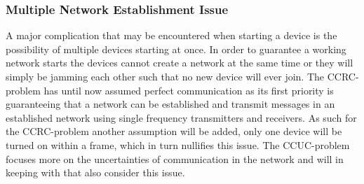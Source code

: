 \subsubsection*{Multiple Network Establishment Issue}\label{msiCCRC}
A major complication that may be encountered when starting a device is the possibility of multiple devices starting at once.
In order to guarantee a working network starts the devices cannot create a network at the same time or they will simply be jamming each other such that no new device will ever join.
The CCRC-problem has until now assumed perfect communication as its first priority is guaranteeing that a network can be established and transmit messages in an established network using single frequency transmitters and receivers.
As such for the CCRC-problem another assumption will be added, only one device will be turned on within a frame, which in turn nullifies this issue.
The CCUC-problem focuses more on the uncertainties of communication in the network and will in keeping with that also consider this issue.